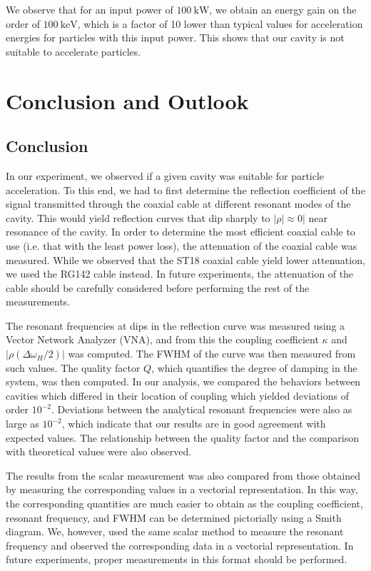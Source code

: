\documentclass[a4paper]{report}
\numberwithin{equation}{section}
\begin{document}
We observe that for an input power of $\SI{100}{\kilo\watt}$, we obtain an energy gain on the order of $\SI{100}{\kilo\electronvolt}$, 
which is a factor of 10 lower than typical values for acceleration energies for particles with this input power. This 
shows that our cavity is not suitable to accelerate particles. \par 

\chapter{Conclusion and Outlook}

\section{Conclusion}

In our experiment, we observed if a given cavity was suitable for particle acceleration. To this end, we had to first determine
the reflection coefficient of the signal transmitted through the coaxial cable at different resonant modes of the cavity. This
would yield reflection curves that dip sharply to $|\rho| \approx 0|$ near resonance of the cavity. In order to determine the 
most efficient coaxial cable to use (i.e. that with the least power loss), the attenuation of the coaxial cable was measured. 
While we observed that the ST18 coaxial cable yield lower attenuation, we used the RG142 cable instead. In future experiments,
the attenuation of the cable should be carefully considered before performing the rest of the measurements. \par 

The resonant frequencies at dips in the reflection curve was measured using a Vector Network Analyzer (VNA), and from this the coupling coefficient $\kappa$
and $|\rho(\Delta\omega_H / 2)|$ was computed. The FWHM of the curve was then measured from such values. The quality factor $Q$, 
which quantifies the degree of damping in the system, was then computed. In our analysis, we compared the behaviors between  
cavities which differed in their location of coupling which yielded deviations of order $10^{-2}$. Deviations between the 
analytical resonant frequencies were also as large as $10^{-2}$, which indicate that our results are in good agreement with
expected values. The relationship between the quality factor and the comparison with theoretical values were also observed. \par 

The results from the scalar measurement was also compared from those obtained by measuring the corresponding values in a vectorial representation. In this way, the corresponding quantities are much easier to 
obtain as the coupling coefficient, resonant frequency, and FWHM can be determined pictorially using a Smith diagram. We, however,
used the same scalar method to measure the resonant frequency and observed the corresponding data in a vectorial representation. 
In future experiments, proper measurements in this format should be performed. \par 
\end{document}
